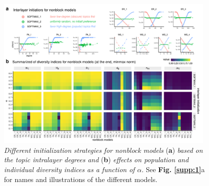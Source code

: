 \begin{figure}[!ht]
    \centering
    \includegraphics[width=0.95\textwidth]{figures/FigS2.pdf}
    \caption{
    \textit{Different initialization strategies for nonblock models} (\textbf{a}) \textit{based on the topic intralayer degrees and }(\textbf{b}) \textit{effects on population and individual diversity indices as a function of $\alpha$}. See \textbf{Fig. \ref{supp:1}}a for names and illustrations of the different models.
    }
    \label{supp:2}
\end{figure}